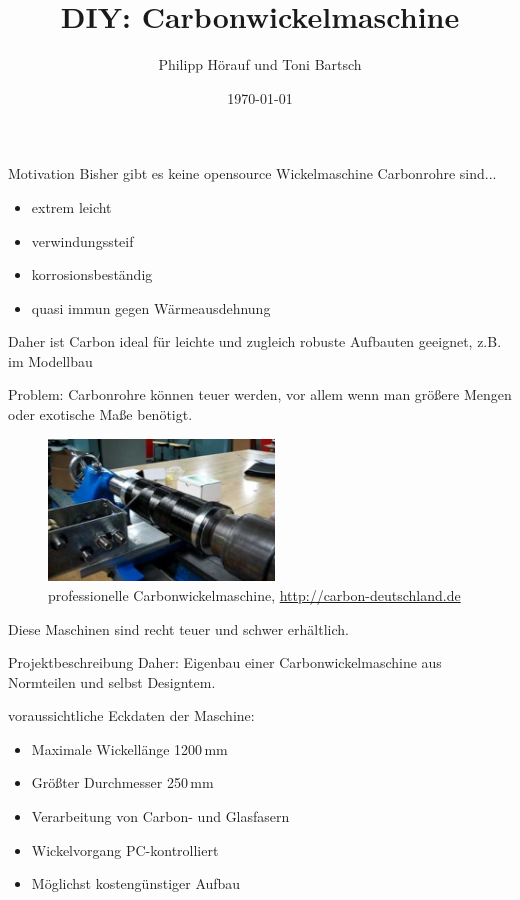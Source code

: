 \documentclass[12pt]{beamer}
\author{Philipp Hörauf und Toni Bartsch}
\title{DIY: Carbonwickelmaschine}
\date{\today}
\begin{document}
\begin{frame}
\titlepage
\end{frame}


\begin{frame}
\tableofcontents
\end{frame}


\begin{frame}{Motivation}
Bisher gibt es keine opensource Wickelmaschine\newline
\vspace{1cm}
\pause
Carbonrohre sind...
\begin{itemize}
	\item<1-> extrem leicht
	\item<2-> verwindungssteif
	\item<3-> korrosionsbeständig
	\item<4-> quasi immun gegen Wärmeausdehnung
\end{itemize}
\vspace*{1cm}
\pause 
Daher ist Carbon ideal für leichte und zugleich robuste Aufbauten geeignet, z.B. im Modellbau
\end{frame}


\begin{frame}
Problem: Carbonrohre können teuer werden, vor allem wenn man größere Mengen oder exotische Maße benötigt.\newline

\begin{figure}
	\includegraphics[width=6cm]{./hqdefault.jpg}
	\caption{professionelle Carbonwickelmaschine, \url{http://carbon-deutschland.de}}
\end{figure}

Diese Maschinen sind recht teuer und schwer erhältlich.
\end{frame}


\begin{frame}{Projektbeschreibung}
Daher: Eigenbau einer Carbonwickelmaschine aus Normteilen und selbst Designtem.\newline
\vspace{0.5cm}

\pause
voraussichtliche Eckdaten der Maschine:
\begin{itemize}
	\item<1-> Maximale Wickellänge 1200\,mm
	\item<2-> Größter Durchmesser 250\,mm
	\item<3-> Verarbeitung von Carbon- und Glasfasern
	\item<4-> Wickelvorgang PC-kontrolliert
	\item<5-> Möglichst kostengünstiger Aufbau
\end{itemize}
\end{frame}
\end{document}

